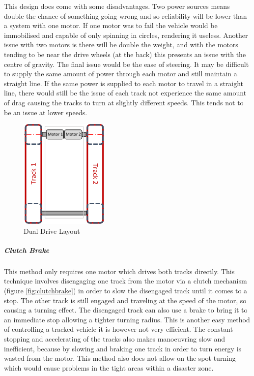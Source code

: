 This design does come with some disadvantages. Two power sources means double the chance of something going wrong and so reliability will be lower than a system with one motor. If one motor was to fail the vehicle would be immobilised and capable of only spinning in circles, rendering it useless. Another issue with two motors is there will be double the weight, and with the motors tending to be near the drive wheels (at the back) this presents an issue with the centre of gravity. The final issue would be the ease of steering. It may be difficult to supply the same amount of power through each motor and still maintain a straight line. If the same power is supplied to each motor to travel in a straight line, there would still be the issue of each track not experience the same amount of drag causing the tracks to turn at slightly different speeds. This tends not to be an issue at lower speeds.\par

\begin{figure}[h]
\centering\includegraphics[width=0.4\linewidth]{Images/DT_Fig_10.png}
\caption{Dual Drive Layout}
\label{fig:dualdrive}
\end{figure}

\subparagraph*{Clutch Brake}

This method only requires one motor which drives both tracks directly. This technique involves disengaging one track from the motor via a clutch mechanism (figure \ref{fig:clutchbrake}) in order to slow the disengaged track until it comes to a stop. The other track is still engaged and traveling at the speed of the motor, so causing a turning effect. The disengaged track can also use a brake to bring it to an immediate stop allowing a tighter turning radius. This is another easy method of controlling a tracked vehicle it is however not very efficient. The constant stopping and accelerating of the tracks also makes manoeuvring slow and inefficient, because by slowing and braking one track in order to turn energy is wasted from the motor. This method also does not allow on the spot turning which would cause problems in the tight areas within a disaster zone.\par

